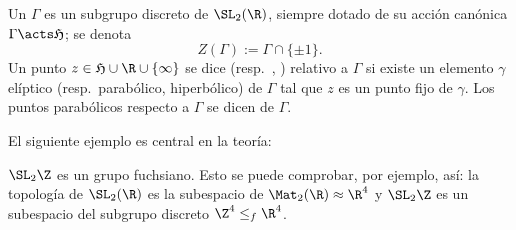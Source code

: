 \documentclass[teoria-numeros.tex]{subfiles}
\begin{document}
\begin{mydefi}
	Un  $\Gamma$ es un subgrupo discreto de $\SL_2(\R)$,
	siempre dotado de su acción canónica $\Gamma \acts \mathfrak{H}$; se denota
	$$ Z(\Gamma) := \Gamma \cap \{ \pm 1 \}. $$
	Un punto $z \in \mathfrak{H} \cup \R \cup \{ \infty \}$ se dice 
	(resp.\ , )
	relativo a $\Gamma$ si existe un elemento $\gamma$ elíptico (resp.\ parabólico, hiperbólico) de $\Gamma$ tal que $z$ es un punto fijo de $\gamma$.
	Los puntos parabólicos respecto a $\Gamma$ se dicen  de $\Gamma$.
\end{mydefi}
El siguiente ejemplo es central en la teoría:
\begin{ex}
	$\SL_2\Z$ es un grupo fuchsiano.
	Esto se puede comprobar, por ejemplo, así:
	la topología de $\SL_2(\R)$ es la subespacio de $\Mat_2(\R) \approx \R^4$ y
	$\SL_2\Z$ es un subespacio del subgrupo discreto $\Z^4 \le_f \R^4$.
\end{ex}
\end{document}
